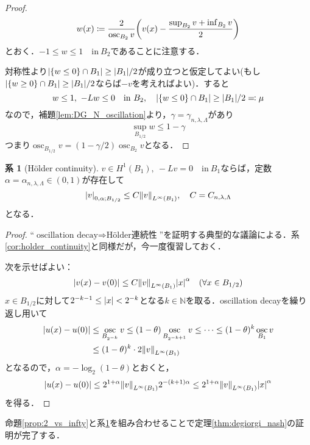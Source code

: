 \documentclass[a4paper]{ltjsarticle}
\newcommand{\Nset}{\mathbb{N}}
\newcommand{\inn}{\quad\text{in}\ }
\newcommand{\1}{\mathbbm{1}}
\DeclareMathOperator*{\osc}{\mathrm{osc}}
\numberwithin{equation}{section}
\theoremstyle{definition}
\newtheorem{cor}[thm]{系}
\begin{document}
\begin{proof}
    \begin{equation}
        w(x)\coloneqq \frac{2}{\osc_{B_2}v}\qty(v(x)-\frac{\sup_{B_2}v+\inf_{B_2}v}{2}) 
    \end{equation}
    とおく．$-1\leq w\leq 1\inn B_2$であることに注意する．

    対称性より$\abs{\qty{w\leq 0}\cap B_1}\geq \abs{B_1}/2$が成り立つと仮定してよい(もし$\abs{\qty{w\geq 0}\cap B_1}\geq \abs{B_1}/2$ならば$-v$を考えればよい)．すると
    \begin{equation}
        w\leq 1,\ -Lw\leq0\inn B_2,\quad \abs{\qty{w\leq0}\cap B_1}\geq \abs{B_1}/2\eqqcolon \mu 
    \end{equation}
    なので，補題\ref{lem:DG_N_oscillation}より，$\gamma=\gamma_{n,\lambda,\Lambda}$があり
    \begin{equation}
        \sup_{B_{1/2}}w\leq 1-\gamma 
    \end{equation}
    つまり$\osc_{B_{1/2}}v=(1-\gamma/2)\osc_{B_{2}}v$となる．
\end{proof}
\begin{cor}[Hölder continuity]\label{cor:DG_N_holder_continuity}
    $v\in H^1(B_1),\ -Lv=0\inn B_1$ならば，定数$\alpha=\alpha_{n,\lambda,\Lambda}\in(0,1)$が存在して
    \begin{equation}
        \abs{v}_{0,\alpha;B_{1/2}}\leq C\norm{v}_{L^\infty(B_1)},\quad C=C_{n,\lambda,\Lambda}
    \end{equation}
    となる．
\end{cor}
\begin{proof}
    ``$\text{oscillation decay}\Longrightarrow\text{Hölder連続性}$''を証明する典型的な議論による．系\ref{cor:holder_continuity}と同様だが，今一度復習しておく．

    次を示せばよい：
    \begin{equation}
        \abs{v(x)-v(0)}\leq C\norm{v}_{L^\infty(B_1)}\abs{x}^{\alpha}\quad (\forall x\in B_{1/2})
    \end{equation}
    $x\in B_{1/2}$に対して$2^{-k-1}\leq \abs{x}<2^{-k}$となる$k\in\Nset$を取る．oscillation decayを繰り返し用いて
    \begin{align}
        \abs{u(x)-u(0)}&\leq \osc_{B_{2^{-k}}}v\leq(1-\theta)\osc_{B_{2^{-k+1}}}v\leq\cdots\leq (1-\theta)^k\osc_{B_1}v\\
        &\leq (1-\theta)^k\cdot 2\norm{v}_{L^\infty(B_1)}
    \end{align}
    となるので，$\alpha=-\log_2(1-\theta)$とおくと，
    \begin{equation}
        \abs{u(x)-u(0)}\leq 2^{1+\alpha}\norm{v}_{L^\infty(B_1)} 2^{-(k+1)\alpha}\leq 2^{1+\alpha}\norm{v}_{L^\infty(B_1)} \abs{x}^{\alpha}
    \end{equation}
    を得る．
\end{proof}
命題\ref{prop:2_vs_infty}と系\ref{cor:DG_N_holder_continuity}を組み合わせることで定理\ref{thm:degiorgi_nash}の証明が完了する．
\end{document}
